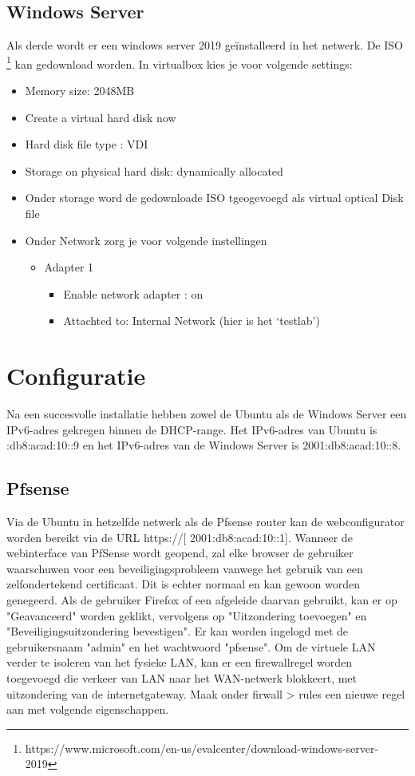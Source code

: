 \subsection{Windows Server}
Als derde wordt er een windows server 2019 geïnstalleerd in het netwerk. De ISO \footnote{https://www.microsoft.com/en-us/evalcenter/download-windows-server-2019} kan gedownload worden.
In virtualbox kies je voor volgende settings:
\begin{itemize}
    \item Memory size: 2048MB 
    \item Create a virtual hard disk now
    \item Hard disk file type : VDI
    \item Storage on physical hard disk: dynamically allocated
    \item Onder storage word de gedownloade ISO tgeogevoegd als virtual optical Disk file
    \item Onder Network zorg je voor volgende instellingen
    \begin{itemize}
        \item Adapter 1
        \begin{itemize}
            \item Enable network adapter : on
            \item Attachted to: Internal Network (hier is het ‘testlab’)
            
        \end{itemize}
    \end{itemize}
    
    
\end{itemize}

\section{Configuratie}
Na een succesvolle installatie hebben zowel de Ubuntu als de Windows Server een IPv6-adres gekregen binnen de DHCP-range. Het IPv6-adres van Ubuntu is :db8:acad:10::9 en het IPv6-adres van de Windows Server is 2001:db8:acad:10::8.

\subsection{Pfsense}
Via de Ubuntu in hetzelfde netwerk als de Pfsense router kan de webconfigurator worden bereikt via de URL https://[ 2001:db8:acad:10::1]. Wanneer de webinterface van PfSense wordt geopend, zal elke browser de gebruiker waarschuwen voor een beveiligingsprobleem vanwege het gebruik van een zelfondertekend certificaat. Dit is echter normaal en kan gewoon worden genegeerd. Als de gebruiker Firefox of een afgeleide daarvan gebruikt, kan er op "Geavanceerd" worden geklikt, vervolgens op "Uitzondering toevoegen" en "Beveiligingsuitzondering bevestigen". Er kan worden ingelogd met de gebruikersnaam "admin" en het wachtwoord "pfsense". Om de virtuele LAN verder te isoleren van het fysieke LAN, kan er een firewallregel worden toegevoegd die verkeer van LAN naar het WAN-netwerk blokkeert, met uitzondering van de internetgateway. Maak onder firwall > rules een nieuwe regel aan met volgende eigenschappen.

